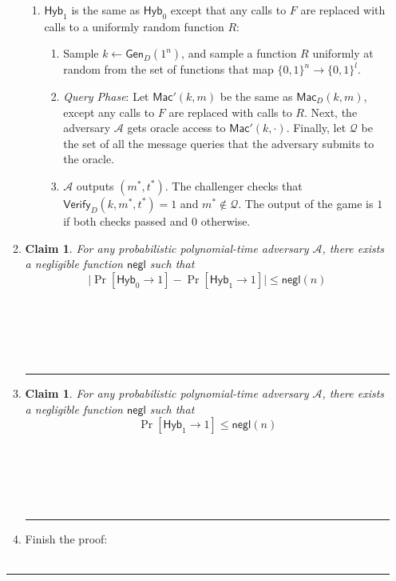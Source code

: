 \documentclass[11pt]{article}
\newcommand\custombox[2]{%
    \fbox{\rule{#1}{0pt}\rule[-0.5ex]{0pt}{#2}}}
\newcommand{\qed}{\hspace*{\fill}\rule{7pt}{7pt}}
\newtheorem{claim}[theorem]{Claim}
\numberwithin{equation}{section}
\newenvironment{proof}{\noindent{\bf Proof}\hspace*{1em}}{\qed\medskip}
\newcommand{\A}{\mathcal{A}}
\newcommand{\negl}{\mathsf{negl}}
\newcommand{\hyb}{\mathsf{Hyb}}
\newcommand{\bin}{\{0,1\}}
\newcommand{\bit}{\bin}
\newcommand{\gen}{\mathsf{Gen}}
\newcommand{\mac}{\mathsf{Mac}}
\newcommand{\verify}{\mathsf{Verify}}
\begin{document}
\begin{enumerate}
\begin{proof}
\begin{enumerate}
\begin{enumerate}
        \item $\hyb_1$ is the same as $\hyb_0$ except that any calls to $F$ are replaced with calls to a uniformly random function $R$:
        {\color{gray}\begin{enumerate}
            \item Sample $k \leftarrow \gen_D(1^n)$, and sample a function $R$ uniformly at random from the set of functions that map $\bit^n \to \bit^{l}$.
            \item \textit{Query Phase}: Let $\mac'(k, m)$ be the same as $\mac_D(k,m)$, except any calls to $F$ are replaced with calls to $R$. Next, the adversary $\A$ gets oracle access to $\mac'(k, \cdot)$. Finally, let $\mathcal{Q}$ be the set of all the message queries that the adversary submits to the oracle.
            \item $\A$ outputs $(m^*, t^*)$. The challenger checks that $\verify_D(k, m^*, t^*) =1 $ and $m^* \notin \mathcal{Q}$. The output of the game is $1$ if both checks passed and $0$ otherwise.
        \end{enumerate}
        }
\end{enumerate}

\item 
\begin{claim}
For any probabilistic polynomial-time adversary $\A$, there exists a negligible function $\negl$ such that 
\[\big|\Pr[\hyb_0 \to 1] - \Pr[\hyb_1 \to 1]\big| \leq \negl(n)\]    
\end{claim}
\begin{proof}
    \\\\ 
    \custombox{5in}{.5in}\\\\
\end{proof}

\item 
\begin{claim}
For any probabilistic polynomial-time adversary $\A$, there exists a negligible function $\negl$ such that 
\[\Pr[\hyb_1 \to 1] \leq \negl(n)\]
\end{claim}
\begin{proof}
    \\\\ 
    \custombox{5in}{.5in}\\\\
\end{proof}

\item 
Finish the proof:
\\\\ 
    \custombox{5in}{.5in}
\end{enumerate}
\end{proof}
\end{enumerate}
\end{document}
